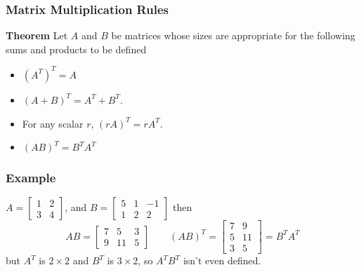 \begin{frame}[fragile]\frametitle{Matrix Multiplication Rules}
\textbf{Theorem}  Let $A$ and $B$ be matrices whose sizes are appropriate for the following 
sums and products to be defined
 \begin{itemize}
  \item $(A^T)^T = A$
\item $(A+B)^T = A^T + B^T$.
\item For any scalar $r$, $(rA)^T=rA^T$.
\item $(AB)^T = B^T A^T$
 \end{itemize}


\end{frame}


\begin{frame}[fragile]\frametitle{Example}
  
$A = \begin{bmatrix} 1 & 2 \\ 3 & 4 \end{bmatrix}$, and $B= 
\begin{bmatrix}
 5 & 1 & -1 \\
 1 & 2 & 2 
\end{bmatrix}$
then 
\[
 AB = \begin{bmatrix}
       7 & 5 & 3 \\
       9 & 11 & 5
      \end{bmatrix}
\qquad 
(AB)^T = \begin{bmatrix} 7 & 9 \\
          5 & 11 \\ 3 & 5
         \end{bmatrix} = B^T A^T
\]
but $A^T$ is $2\times 2$ and $B^T$ is $3 \times 2$, so $A^TB^T$ isn't even defined.

\end{frame}


